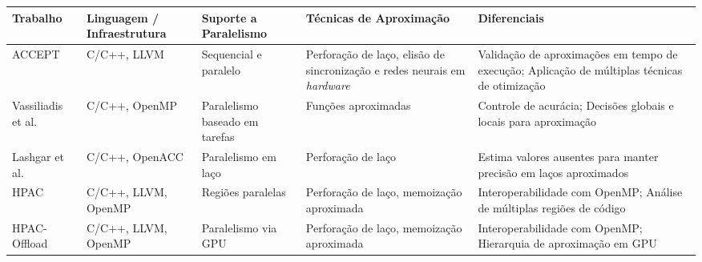 \begin{table}[htb]
    \centering

    \begin{tabular}{|p{2.3cm}|p{3cm}|p{2cm}|p{3cm}|p{4cm}|}
        \hline
        \textbf{Trabalho}                         & \textbf{Linguagem / Infraestrutura} & \textbf{Suporte a Paralelismo} & \textbf{Técnicas de Aproximação}                                                                        & \textbf{Diferenciais}                                                                                                                                                      \\
        \hline
        ACCEPT~\cite{sampson2015}                 & C/C++, LLVM                         & Sequencial e paralelo          & Perforação de laço, elisão de sincronização e redes neurais em \textit{hardware}                        & Validação de aproximações em tempo de execução; Aplicação de múltiplas técnicas de otimização                                                                              \\
        \hline
        Vassiliadis et al.~\cite{vassiliadis2015} & C/C++, OpenMP                       & Paralelismo baseado em tarefas & Funções aproximadas                                                                                     & Controle de acurácia; Decisões globais e locais para aproximação                                                                                                           \\
        \hline
        Lashgar et al.~\cite{lashgar2018}         & C/C++, OpenACC                      & Paralelismo em laço            & Perforação de laço                                                                                      & Estima valores ausentes para manter precisão em laços aproximados                                                                                                          \\
        \hline
        HPAC~\cite{parasyris2021}                 & C/C++, LLVM, OpenMP                 & Regiões paralelas              & Perforação de laço, memoização aproximada                                                               & Interoperabilidade com OpenMP; Análise de múltiplas regiões de código                                                                                                      \\
        \hline
        HPAC-Offload~\cite{fink2023}              & C/C++, LLVM, OpenMP                 & Paralelismo via GPU            & Perforação de laço, memoização aproximada                                                               & Interoperabilidade com OpenMP; Hierarquia de aproximação em GPU                                                                                                            \\

\end{tabular}
\end{table}
